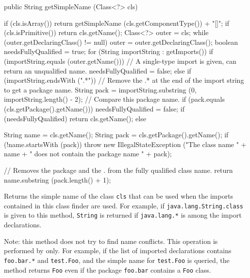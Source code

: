 \begin{code}

   public String getSimpleName (Class<?> cls)\begin{hide} {
      if (cls.isArray())
         return getSimpleName (cls.getComponentType()) + "[]";
      if (cls.isPrimitive())
         return cls.getName();
      Class<?> outer = cls;
      while (outer.getDeclaringClass() != null)
         outer = outer.getDeclaringClass();
      boolean needsFullyQualified = true;
      for (String importString : getImports()) {
         if (importString.equals (outer.getName()))
             // A single-type import is given, can return an unqualified name.
            needsFullyQualified = false;
         else if (importString.endsWith (".*")) {
            // Remove the .* at the end of the import string to get a package name.
            String pack = importString.substring (0, importString.length() - 2);
            // Compare this package name.
            if (pack.equals (cls.getPackage().getName()))
               needsFullyQualified = false;
         }
      }
      if (needsFullyQualified)
         return cls.getName();
      else {
         String name = cls.getName();
         String pack = cls.getPackage().getName();
         if (!name.startsWith (pack))
            throw new IllegalStateException
               ("The class name " + name +
                " does not contain the package name " + pack);

         // Removes the package and the . from the fully qualified class name.
         return name.substring (pack.length() + 1);
      }         
   }\end{hide}
\end{code}
\begin{tabb}   Returns the simple name of the class \texttt{cls} that
 can be used when the imports contained
 in this class finder are used.
 For example, if \texttt{java.lang.String.class} is given
 to this method, \texttt{String} is returned if
 \texttt{java.lang.*} is among the import declarations.

 Note: this method does not try to find name conflicts.
 This operation is performed by  only.
 For example, if the list of imported declarations
 contains \texttt{foo.bar.*} and \texttt{test.Foo}, and
 the simple name for \texttt{test.Foo} is queried,
 the method returns \texttt{Foo} even if the package
 \texttt{foo.bar} contains a \texttt{Foo} class.
\end{tabb}
\begin{htmlonly}
\end{htmlonly}

